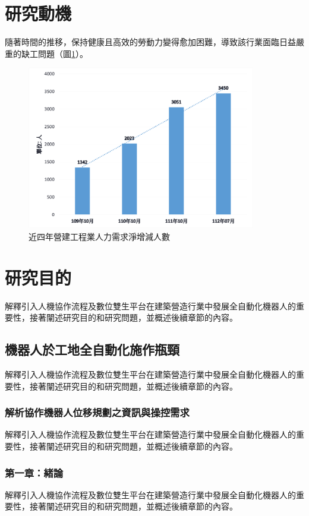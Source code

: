 \section{研究動機}
隨著時間的推移，保持健康且高效的勞動力變得愈加困難，導致該行業面臨日益嚴重的缺工問題（圖\ref{fig:example_tag}）。

\begin{figure}[H]
    \centering
    \includegraphics[width=10cm]{images/example.png}
    \caption{近四年營建工程業人力需求淨增減人數}
    \label{fig:example_tag}
\end{figure}

\section{研究目的}
解釋引入人機協作流程及數位雙生平台在建築營造行業中發展全自動化機器人的重要性，接著闡述研究目的和研究問題，並概述後續章節的內容。

\subsection{機器人於工地全自動化施作瓶頸}
解釋引入人機協作流程及數位雙生平台在建築營造行業中發展全自動化機器人的重要性，接著闡述研究目的和研究問題，並概述後續章節的內容。

\subsubsection{解析協作機器人位移規劃之資訊與操控需求} %
解釋引入人機協作流程及數位雙生平台在建築營造行業中發展全自動化機器人的重要性，接著闡述研究目的和研究問題，並概述後續章節的內容。

\subsubsection{第一章：緒論}
解釋引入人機協作流程及數位雙生平台在建築營造行業中發展全自動化機器人的重要性，接著闡述研究目的和研究問題，並概述後續章節的內容。

